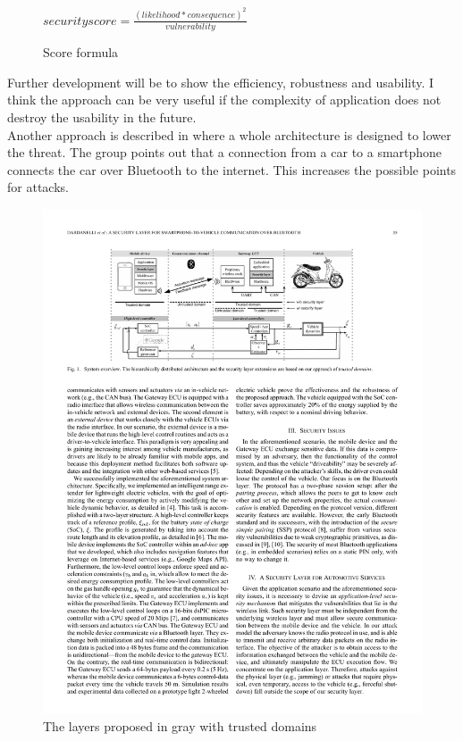 \documentclass[12pt,a4paper]{article}
\begin{document}
\begin{figure}[h]
\begin{center}
\begin{math}
	security score = \frac{(likelihood * consequence)^2}{vulnerability}
\end{math}
\caption{Score formula \cite{DBLP:conf/automotiveSS/JakobKSGMSF12}}
\label{security_formula}
\end{center}
\end{figure}
Further development will be to show the efficiency, robustness and usability.
I think the approach can be very useful if the complexity of application does not destroy the usability in the future.\\

Another approach is described in \cite{DBLP:journals/esl/DardanelliMTZSKH13} where a whole architecture is designed to lower the threat. The group points out that a connection from a car to a smartphone connects the car over Bluetooth to the internet. This increases the possible points for attacks.

\begin{figure}[h]
\begin{center}
	\includegraphics{img/security_layer_bt}
\caption{The layers proposed in gray with trusted domains \cite{DBLP:journals/esl/DardanelliMTZSKH13}}
\label{img_security_layer_bt}
\end{center}
\end{figure}
\end{document}
